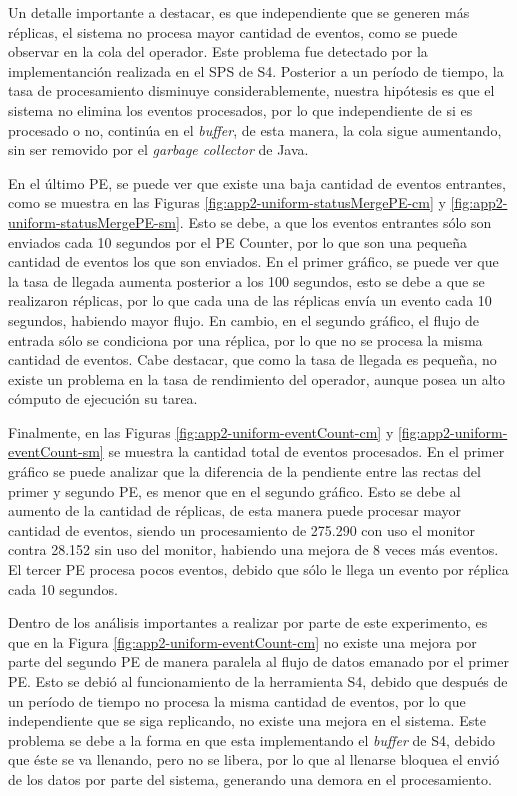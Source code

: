 Un detalle importante a destacar, es que independiente que se generen más réplicas, el sistema no procesa mayor cantidad de eventos, como se puede observar en la cola del operador. Este problema fue detectado por la implementanción realizada en el SPS de S4.  Posterior a un período de tiempo, la tasa de procesamiento disminuye considerablemente, nuestra hipótesis es que el sistema no elimina los eventos procesados, por lo que independiente de si es procesado o no, continúa en el \textit{buffer}, de esta manera, la cola sigue aumentando, sin ser removido por el \textit{garbage collector} de Java.

En el último PE, se puede ver que existe una baja cantidad de eventos entrantes, como se muestra en las Figuras \ref{fig:app2-uniform-statusMergePE-cm} y \ref{fig:app2-uniform-statusMergePE-sm}. Esto se debe, a que los eventos entrantes sólo son enviados cada 10 segundos por el PE Counter, por lo que son una pequeña cantidad de eventos los que son enviados. En el primer gráfico, se puede ver que la tasa de llegada aumenta posterior a los 100 segundos, esto se debe a que se realizaron réplicas, por lo que cada una de las réplicas envía un evento cada 10 segundos, habiendo mayor flujo. En cambio, en el segundo gráfico, el flujo de entrada sólo se condiciona por una réplica, por lo que no se procesa la misma cantidad de eventos. Cabe destacar, que como la tasa de llegada es pequeña, no existe un problema en la tasa de rendimiento del operador, aunque posea un alto cómputo de ejecución su tarea.

Finalmente, en las Figuras \ref{fig:app2-uniform-eventCount-cm} y \ref{fig:app2-uniform-eventCount-sm} se muestra la cantidad total de eventos procesados. En el primer gráfico se puede analizar que la diferencia de la pendiente entre las rectas del primer y segundo PE, es menor que en el segundo gráfico. Esto se debe al aumento de la cantidad de réplicas, de esta manera puede procesar mayor cantidad de eventos, siendo un procesamiento de 275.290 con uso el monitor contra 28.152 sin uso del monitor, habiendo una mejora de 8 veces más eventos. El tercer PE procesa pocos eventos, debido que sólo le llega un evento por réplica cada 10 segundos.

Dentro de los análisis importantes a realizar por parte de este experimento, es que en la Figura \ref{fig:app2-uniform-eventCount-cm} no existe una mejora por parte del segundo PE de manera paralela al flujo de datos emanado por el primer PE. Esto se debió al funcionamiento de la herramienta S4, debido que después de un período de tiempo no procesa la misma cantidad de eventos, por lo que independiente que se siga replicando, no existe una mejora en el sistema. Este problema se debe a la forma en que esta implementando el \textit{buffer} de S4, debido que éste se va llenando, pero no se libera, por lo que al llenarse bloquea el envió de los datos por parte del sistema, generando una demora en el procesamiento.

